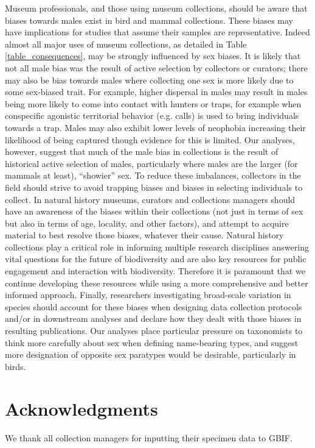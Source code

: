 \documentclass[a4paper, 12pt]{article}
\begin{document}
Museum professionals, and those using museum collections, should be aware that biases towards males exist in bird and mammal collections. 
These biases may have implications for studies that assume their samples are representative. Indeed almost all major uses of museum collections, as detailed in Table \ref{table_consequences}, may be strongly influenced by sex biases. 
It is likely that not all male bias was the result of active selection by collectors or curators; there may also be bias towards males where collecting one sex is more likely due to some sex-biased trait. 
For example, higher dispersal in males may result in males being more likely to come into contact with hunters or traps, for example when conspecific agonistic territorial behavior (e.g. calls) is used to bring individuals towards a trap. 
Males may also exhibit lower levels of neophobia increasing their likelihood of being captured though evidence for this is limited\cite{crane2017patterns,laviola1992sexual}. 
Our analyses, however, suggest that much of the male bias in collections is the result of historical active selection of males, particularly where males are the larger (for mammals at least), ``showier'' sex. 
To reduce these imbalances, collectors in the field should strive to avoid trapping biases and biases in selecting individuals to collect. 
In natural history museums, curators and collections managers should have an awareness of the biases within their collections (not just in terms of sex but also in terms of age, locality, and other factors), and attempt to acquire material to best resolve those biases, whatever their cause. 
Natural history collections play a critical role in informing multiple research disciplines answering vital questions for the future of biodiversity\cite{meineke2018biological} and are also key resources for public engagement and interaction with biodiversity\cite{machin2008}. 
Therefore it is paramount that we continue developing these resources while using a more comprehensive and better informed approach. 
Finally, researchers investigating broad-scale variation in species should account for these biases when designing data collection protocols and/or in downstream analyses and declare how they dealt with those biases in resulting publications. 
Our analyses place particular pressure on taxonomists to think more carefully about sex when defining name-bearing types, and suggest more designation of opposite sex paratypes would be desirable, particularly in birds. 

\section{Acknowledgments}
We thank all collection managers for inputting their specimen data to GBIF.
\end{document}
